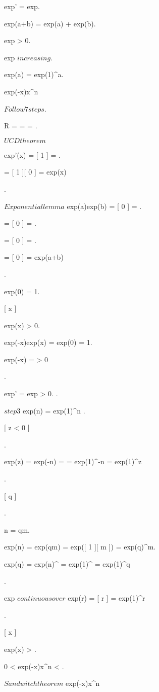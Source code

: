 {{{		exp' = exp.

		exp(a+b) = exp(a) + exp(b).

		exp > 0.

		exp $ increasing $.

		exp(a) = exp(1)^a.

		{
			exp(-x)x^n 
		} 
	}
	\demonstration
	{
		$ Follow 7 steps $.
		
		{
			R =  =  = \infty
		}.
		
		{
			$UCD theorem$ \imp {}
			{
				exp'(x) = [ 1 ] = .

				= [ 1 ][ 0 ] = exp(x)
			}
		}.

		{

			$Exponential lemma$ \imp exp(a)exp(b) = [ 0 ] = .

			= [ 0 ] = .

			= [ 0 ] = .

			= [ 0 ] = exp(a+b)
		}.

		{
			exp(0) = 1.

			[ x  ]
			{
				exp(x) > 0.

				exp(-x)exp(x) = exp(0) = 1.

				exp(-x) =  > 0
			}
		}.

		{
			exp' = exp > 0.
		}.

		{
			{
				$step 3$ \imp exp(n) = exp(1)^n 
			}.

			{
				.

				exp(z) = exp(-n) =  = exp(1)^{-n} = exp(1)^z
			}.

			[ q  ]
			{
				.

				n = qm.

				exp(n) = exp(qm) = exp([ 1 ][ m ]) = exp(q)^m.

				exp(q) = exp(n)^{} = exp(1)^{} = exp(1)^q
			}.

			{
				exp $ continuous over $ \R \imp exp(r) = [ r ] = exp(1)^r
			}
		}.

		{
			{
				{
					exp(x) > .

					0 < exp(-x)x^n < .

					$Sandwitch theorem$ \imp exp(-x)x^n 
				}
			}
		}

	}}
}